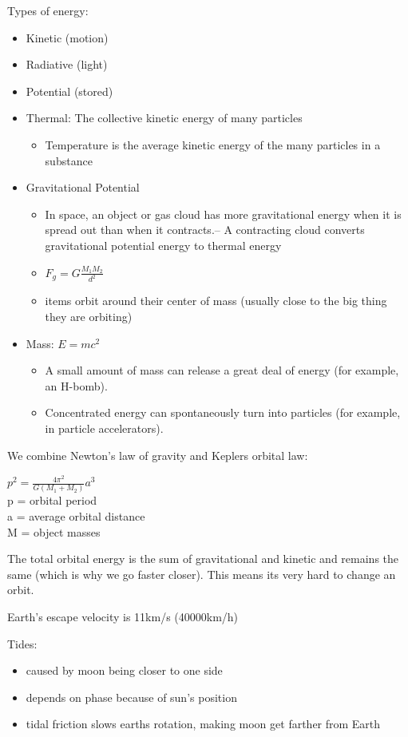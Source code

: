 \documentclass[12pt]{article}
\begin{document}
Types of energy:
\begin{itemize}
\item Kinetic (motion)
\item Radiative (light)
\item Potential (stored)
\item Thermal: The collective kinetic energy of many particles
\begin{itemize}
\item Temperature is the average kinetic energy of the many particles in a substance
\end{itemize}
\item Gravitational Potential
\begin{itemize}
\item In space, an object or gas cloud has more gravitational energy when it is spread out than when it contracts.– A contracting cloud converts gravitational potential energy to thermal energy
\item $F_g = G\frac{M_1 M_2}{d^2}$
\item items orbit around their center of mass (usually close to the big thing they are orbiting)
\end{itemize}
\item Mass: $E = mc^2$
\begin{itemize}
\item A small amount of mass can release a great deal of energy (for example, an H-bomb).
\item Concentrated energy can spontaneously turn into particles (for example, in particle accelerators).
\end{itemize}
\end{itemize}

We combine Newton's law of gravity and Keplers orbital law:\\
\begin{center}
$p^2 = \frac{4\pi^2}{G(M_1 + M_2)}a^3$\\
p = orbital period\\
a = average orbital distance\\
M = object masses
\end{center}

The total orbital energy is the sum of gravitational and kinetic and remains the same (which is why we go faster closer). This means its very hard to change an orbit.

Earth's escape velocity is 11km/s (40000km/h)

Tides:
\begin{itemize}
\item caused by moon being closer to one side
\item depends on phase because of sun's position
\item tidal friction slows earths rotation, making moon get farther from Earth
\end{itemize}
\end{document}
